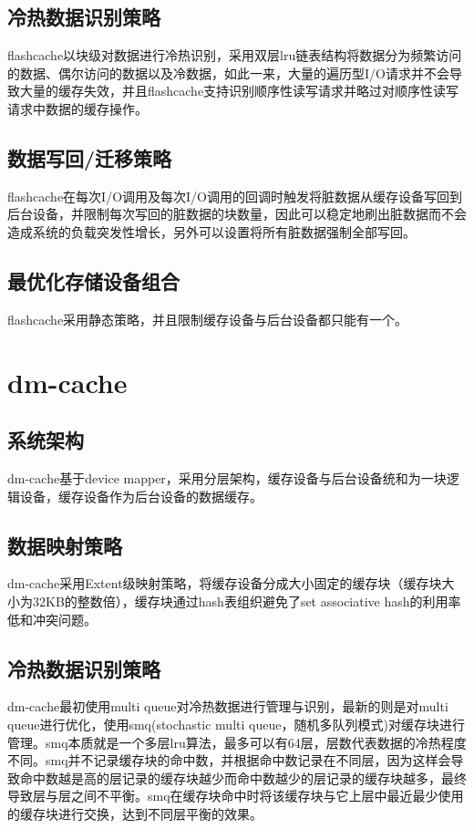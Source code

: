 \subsection{冷热数据识别策略}

flashcache以块级对数据进行冷热识别，采用双层lru链表结构将数据分为频繁访问的数据、偶尔访问的数据以及冷数据，如此一来，大量的遍历型I/O请求并不会导致大量的缓存失效，并且flashcache支持识别顺序性读写请求并略过对顺序性读写请求中数据的缓存操作。

\subsection{数据写回/迁移策略}

flashcache在每次I/O调用及每次I/O调用的回调时触发将脏数据从缓存设备写回到后台设备，并限制每次写回的脏数据的块数量，因此可以稳定地刷出脏数据而不会造成系统的负载突发性增长，另外可以设置将所有脏数据强制全部写回。

\subsection{最优化存储设备组合}

flashcache采用静态策略，并且限制缓存设备与后台设备都只能有一个。

\section{dm-cache}

\subsection{系统架构}

dm-cache基于device mapper，采用分层架构，缓存设备与后台设备统和为一块逻辑设备，缓存设备作为后台设备的数据缓存。

\subsection{数据映射策略}

dm-cache采用Extent级映射策略，将缓存设备分成大小固定的缓存块（缓存块大小为32KB的整数倍），缓存块通过hash表组织避免了set associative hash的利用率低和冲突问题。

\subsection{冷热数据识别策略}

dm-cache最初使用multi queue对冷热数据进行管理与识别，最新的则是对multi queue进行优化，使用smq(stochastic multi queue，随机多队列模式)对缓存块进行管理。smq本质就是一个多层lru算法，最多可以有64层，层数代表数据的冷热程度不同。smq并不记录缓存块的命中数，并根据命中数记录在不同层，因为这样会导致命中数越是高的层记录的缓存块越少而命中数越少的层记录的缓存块越多，最终导致层与层之间不平衡。smq在缓存块命中时将该缓存块与它上层中最近最少使用的缓存块进行交换，达到不同层平衡的效果。

